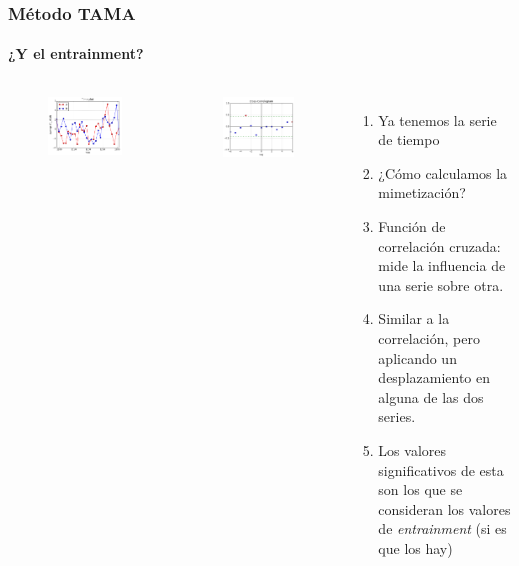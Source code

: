 \begin{frame}
  \frametitle{Método TAMA}
  \framesubtitle{¿Y el entrainment?}
  \begin{columns}
  \begin{figure}[t]
    \includegraphics[scale=0.28]{images/time_plot.png}
  \end{figure}
  \begin{figure}[t]
    \includegraphics[scale=0.28]{images/cross_correlogram.png}
  \end{figure}
  \begin{enumerate}
    \item Ya tenemos la serie de tiempo
    \item ¿Cómo calculamos la mimetización?
    \item Función de correlación cruzada: mide la influencia de una serie sobre otra.
    \item Similar a la correlación, pero aplicando un desplazamiento en alguna de las dos series.
    \item Los valores significativos de esta son los que se consideran los valores de \emph{entrainment} (si es que los hay)
  \end{enumerate}

  \end{columns}
\end{frame}

